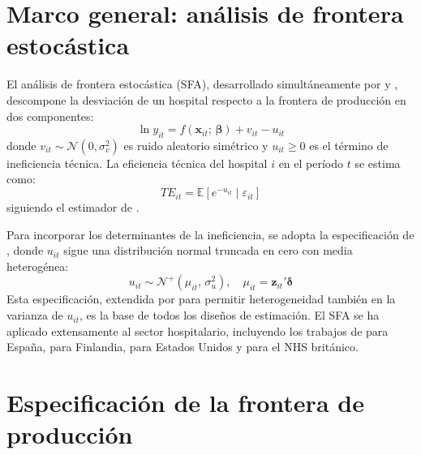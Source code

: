 \documentclass[12pt, a4paper, twoside, openright]{book}
\newcommand{\E}{\mathbb{E}}
\newcommand{\N}{\mathcal{N}}
\newcommand{\bsym}[1]{\boldsymbol{#1}}
\theoremstyle{plain}
\theoremstyle{definition}
\theoremstyle{remark}
\begin{document}
\section{Marco general: análisis de frontera estocástica}

El análisis de frontera estocástica (SFA), desarrollado simultáneamente por \citet{aigner1977} y \citet{meeusen1977}, descompone la desviación de un hospital respecto a la frontera de producción en dos componentes:
\begin{equation}
  \ln y_{it} = f(\mathbf{x}_{it};\,\bsym{\beta}) + v_{it} - u_{it}
  \label{eq:sfa_base}
\end{equation}
donde $v_{it} \sim \N(0, \sigma^2_v)$ es ruido aleatorio simétrico y $u_{it} \geq 0$ es el término de ineficiencia técnica. La eficiencia técnica del hospital $i$ en el período $t$ se estima como:
\begin{equation}
  TE_{it} = \E\!\left[e^{-u_{it}} \mid \varepsilon_{it}\right]
  \label{eq:te}
\end{equation}
siguiendo el estimador de \citet{jondrow1982}.

Para incorporar los determinantes de la ineficiencia, se adopta la especificación de \citet{battese1995}, donde $u_{it}$ sigue una distribución normal truncada en cero con media heterogénea:
\begin{equation}
  u_{it} \sim \N^+\!\left(\mu_{it},\, \sigma^2_u\right), \quad \mu_{it} = \mathbf{z}_{it}'\bsym{\delta}
  \label{eq:bc95}
\end{equation}
Esta especificación, extendida por \citet{wang2002} para permitir heterogeneidad también en la varianza de $u_{it}$, es la base de todos los diseños de estimación. El SFA se ha aplicado extensamente al sector hospitalario, incluyendo los trabajos de \citet{puigjunoy2000} para España, \citet{linna1998} para Finlandia, \citet{rosko2008} para Estados Unidos y \citet{street2003} para el NHS británico.

\section{Especificación de la frontera de producción}
\end{document}
